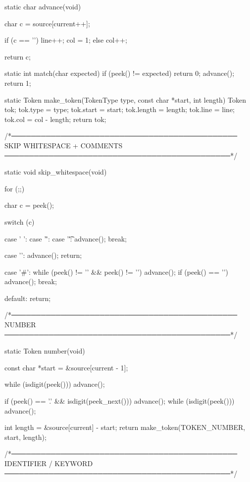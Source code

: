 \documentclass{article}
\begin{document}
static char advance(void)
{
    char c = source[current++];

    if (c == '\n') {
        line++;
        col = 1;
    } else {
        col++;
    }

    return c;
}

static int match(char expected)
{
    if (peek() != expected) return 0;
    advance();
    return 1;
}

static Token make_token(TokenType type, const char *start, int length)
{
    Token tok;
    tok.type   = type;
    tok.start  = start;
    tok.length = length;
    tok.line   = line;
    tok.col    = col - length;
    return tok;
}

/*──────────────────────────────────────────────
  SKIP WHITESPACE + COMMENTS
──────────────────────────────────────────────*/

static void skip_whitespace(void)
{
    for (;;) {
        char c = peek();

        switch (c) {

            case ' ':
            case '\r':
            case '\t':
                advance();
                break;

            case '\n':
                advance();
                return;

            case '#':
                while (peek() != '\n' && peek() != '\0') {
                    advance();
                }
                if (peek() == '\n') advance();
                break;

            default:
                return;
        }
    }
}

/*──────────────────────────────────────────────
  NUMBER
──────────────────────────────────────────────*/

static Token number(void)
{
    const char *start = &source[current - 1];

    while (isdigit(peek()))
        advance();

    if (peek() == '.' && isdigit(peek_next())) {
        advance();
        while (isdigit(peek()))
            advance();
    }

    int length = &source[current] - start;
    return make_token(TOKEN_NUMBER, start, length);
}

/*──────────────────────────────────────────────
  IDENTIFIER / KEYWORD
──────────────────────────────────────────────*/
\end{document}
